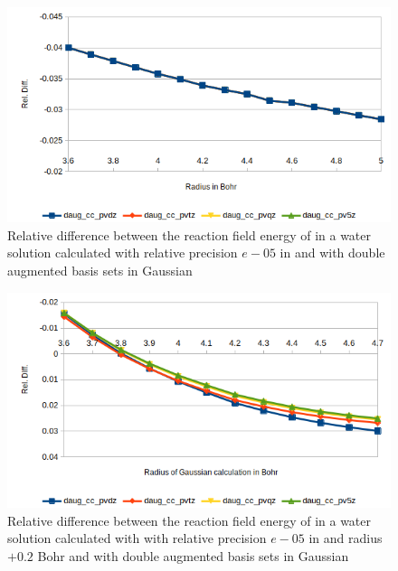 \documentclass[../Thesis.tex]{subfiles}
\begin{document}
\begin{figure}[!htb]
  \centering
  \includegraphics[width=\linewidth]{img/lipdaugreldiff.png}
  \caption[Relative difference of  against Gaussian double augmented results]{Relative difference between the reaction field energy of  in a water solution calculated with relative precision $e-05$ in \mrchem
  and with double augmented basis sets in Gaussian}
  \label{fig:lipreldiffdaug}
\end{figure}



\begin{figure}[!htb]
  \centering
    \includegraphics[width=\linewidth]{img/watdaugreldiff02.png}
  \caption[Relative difference of shifted radius  against Gaussian double augmented results]{Relative difference between the reaction field energy of  in a water solution calculated with with relative precision $e-05$ in \mrchem and radius $+ 0.2$ Bohr
  and with double augmented basis sets in Gaussian}
  \label{fig:watreldiff02daug}
\end{figure}
\end{document}
